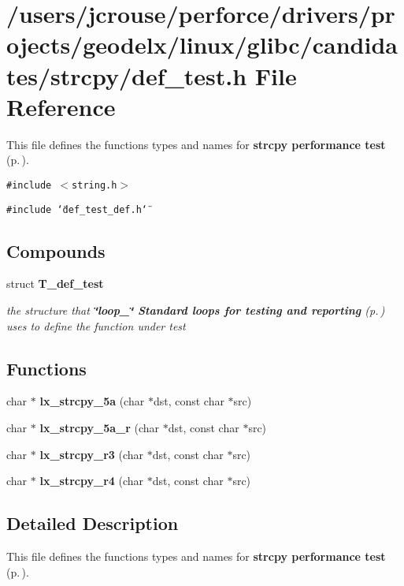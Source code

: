 \section{/users/jcrouse/perforce/drivers/projects/geodelx/linux/glibc/candidates/strcpy/def\_\-test.h File Reference}
\label{strcpy_2def__test_8h}
This file defines the functions types and names for {\bf strcpy performance test} {\rm (p.\,\pageref{group__strcpy__test})}. 


{\tt \#include $<$string.h$>$}\par
{\tt \#include \char`\"{}def\_\-test\_\-def.h\char`\"{}}\par
\subsection*{Compounds}
\begin{CompactItemize}
\item 
struct {\bf T\_\-def\_\-test}
\begin{CompactList}\small\item\em the structure that {\bf \char`\"{}loop\_\-\char`\"{} Standard loops for testing and reporting} {\rm (p.\,\pageref{group__loop__test})} uses to define the function under test\item\end{CompactList}\end{CompactItemize}
\subsection*{Functions}
\begin{CompactItemize}
\item 
char $\ast$ {\bf lx\_\-strcpy\_\-5a} (char $\ast$dst, const char $\ast$src)
\item 
char $\ast$ {\bf lx\_\-strcpy\_\-5a\_\-r} (char $\ast$dst, const char $\ast$src)
\item 
char $\ast$ {\bf lx\_\-strcpy\_\-r3} (char $\ast$dst, const char $\ast$src)
\item 
char $\ast$ {\bf lx\_\-strcpy\_\-r4} (char $\ast$dst, const char $\ast$src)
\end{CompactItemize}


\subsection{Detailed Description}
This file defines the functions types and names for {\bf strcpy performance test} {\rm (p.\,\pageref{group__strcpy__test})}.





